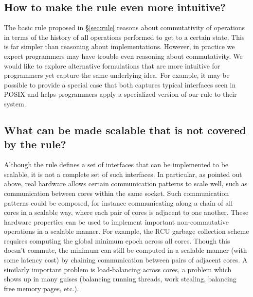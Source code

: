 \subsection{How to make the rule even more intuitive?}

The basic rule proposed in \S\ref{sec:rule} reasons about commutativity
of operations in terms of the history of all operations performed to
get to a certain state.  This is far simpler than reasoning about
implementations.
%
However, in practice we expect programmers may
have trouble even reasoning about commutativity.
We would like to explore alternative
formulations that are more intuitive for programmers yet capture the
same underlying idea.  For example, it may be possible to provide
a special case that both captures typical interfaces seen in POSIX and
helps programmers apply a specialized version of our rule to their
system.


\subsection{What can be made scalable that is not covered by the rule?}
\label{sec:asymptotic}

Although the rule defines a set of interfaces that can be implemented to be
scalable, it is not a complete set of such interfaces.  In particular,
as pointed out above,
real hardware allows certain communication patterns
to scale well, such as communication between cores within the same socket.
Such communication patterns could
be composed, for instance communicating along a chain of all cores in
a scalable way, where each pair of cores is adjacent to one another.
%
These hardware properties can be used to implement important
non-commutative operations in a scalable manner.  For example, the RCU
garbage collection scheme requires computing the global minimum epoch
across all cores. Though this doesn't commute, the minimum can still be
computed in a scalable manner (with some latency cost) by chaining communication between pairs of
adjacent cores.
%
A similarly important problem is load-balancing across cores, a
problem which shows up in many guises (balancing running threads,
work stealing, balancing free memory pages, etc.).

